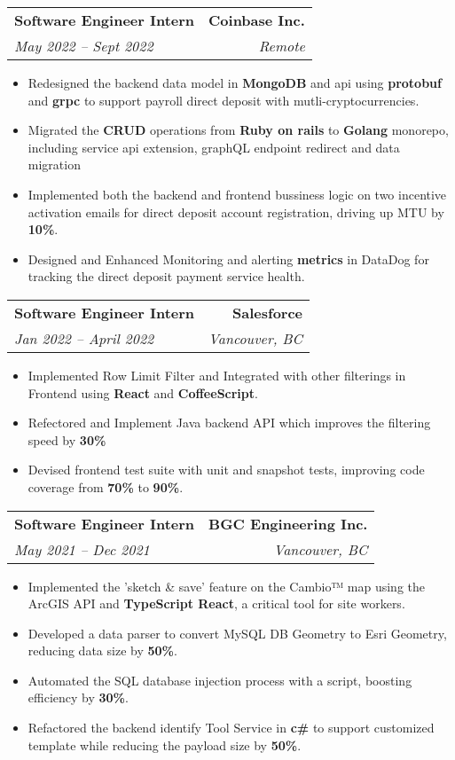 \documentclass[letterpaper,11pt]{article}
\makeatletter
\newcommand{\resumeSubheading}[4]{
  \vspace{-1pt}\item
    \begin{tabular*}{0.97\textwidth}{@{}l@{\extracolsep{\fill}}r@{}}
      \textbf{#1} & #2 \\
      \textit{#3} & \textit{ #4} \\
    \end{tabular*}
    \vspace{-10pt}
}
\newcommand{\resumeItemListStart}{\begin{itemize}}
\newcommand{\resumeItemListEnd}{\end{itemize}\vspace{-5pt}}
\makeatother
\begin{document}
\resumeSubheading
  {Software Engineer Intern}{\textbf{Coinbase Inc.}}
  {May 2022 -- Sept 2022}{Remote}
  \resumeItemListStart  
    \item Redesigned the backend data model in \textbf{MongoDB} and api using \textbf{protobuf} and \textbf{grpc} to support payroll direct deposit with mutli-cryptocurrencies.
    \item Migrated the \textbf{CRUD} operations from \textbf{Ruby on rails} to \textbf{Golang} monorepo, including service api extension, graphQL endpoint redirect and data migration
    \item Implemented both the backend and frontend bussiness logic on two incentive activation emails for direct deposit account registration, driving up MTU by \textbf{10\%}.
    \item Designed and Enhanced Monitoring and alerting \textbf{metrics} in DataDog for tracking the direct deposit payment service health.
  \resumeItemListEnd

  \resumeSubheading
    {Software Engineer Intern}{\textbf{Salesforce}}
    {Jan 2022 -- April 2022}{Vancouver, BC}
    \resumeItemListStart  
      \item Implemented Row Limit Filter and Integrated with other filterings in Frontend using \textbf{React} and \textbf{CoffeeScript}.
      \item Refectored and Implement Java backend API which improves the filtering speed by \textbf{30\%}  
      \item Devised frontend test suite with unit and snapshot tests, improving code coverage from \textbf{70\%} to \textbf{90\%}.
    \resumeItemListEnd

  \resumeSubheading
    {Software Engineer Intern}{\textbf{BGC Engineering Inc.}}
    {May 2021 -- Dec 2021}{Vancouver, BC}
    \resumeItemListStart
    \setlength\itemsep{-0.2em}
      \item Implemented the 'sketch \& save' feature on the Cambio™ map using the ArcGIS API and \textbf{TypeScript React}, a critical tool for site workers.
      \item Developed a data parser to convert MySQL DB Geometry to Esri Geometry, reducing data size by \textbf{50\%}.
      \item Automated the SQL database injection process with a script, boosting efficiency by \textbf{30\%}.
      \item Refactored the backend identify Tool Service in \textbf{c\#} to support customized template while reducing the payload size by \textbf{50\%}.
  \resumeItemListEnd
  
\end{document}
